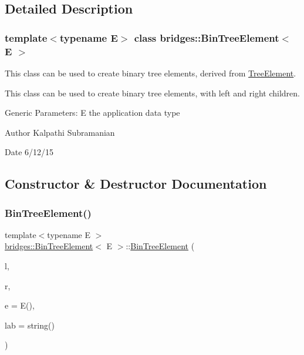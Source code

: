 \subsection{Detailed Description}
\subsubsection*{template$<$typename E$>$\newline
class bridges\+::\+Bin\+Tree\+Element$<$ E $>$}

This class can be used to create binary tree elements, derived from \mbox{\hyperlink{classbridges_1_1_tree_element}{Tree\+Element}}. 

This class can be used to create binary tree elements, with left and right children.

Generic Parameters\+: E the application data type

\begin{DoxyAuthor}{Author}
Kalpathi Subramanian 
\end{DoxyAuthor}
\begin{DoxyDate}{Date}
6/12/15 
\end{DoxyDate}


\subsection{Constructor \& Destructor Documentation}
\mbox{\label{classbridges_1_1_bin_tree_element_a1c60db90bda9ecd3f5a61b5f33f49173}} 
\subsubsection{\texorpdfstring{Bin\+Tree\+Element()}{BinTreeElement()}\hspace{0.1cm}{\footnotesize\ttfamily [1/2]}}
{\footnotesize\ttfamily template$<$typename E $>$ \\
\mbox{\hyperlink{classbridges_1_1_bin_tree_element}{bridges\+::\+Bin\+Tree\+Element}}$<$ E $>$\+::\mbox{\hyperlink{classbridges_1_1_bin_tree_element}{Bin\+Tree\+Element}} (\begin{DoxyParamCaption}\item[{\mbox{\hyperlink{classbridges_1_1_bin_tree_element}{Bin\+Tree\+Element}}$<$ E $>$ $\ast$}]{l,  }\item[{\mbox{\hyperlink{classbridges_1_1_bin_tree_element}{Bin\+Tree\+Element}}$<$ E $>$ $\ast$}]{r,  }\item[{const E \&}]{e = {\ttfamily E()},  }\item[{const string \&}]{lab = {\ttfamily string()} }\end{DoxyParamCaption})\hspace{0.3cm}{\ttfamily [inline]}}

